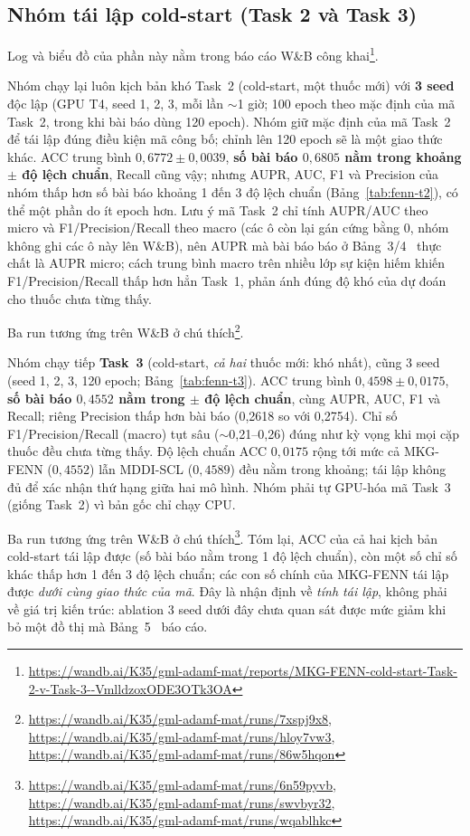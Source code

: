 \documentclass[conference]{IEEEtran}
\begin{document}
\subsection{Nhóm tái lập cold-start (Task 2 và Task 3)}
\noindent Log và biểu đồ của phần này nằm trong báo cáo W\&B công khai\footnote{\url{https://wandb.ai/K35/gml-adamf-mat/reports/MKG-FENN-cold-start-Task-2-v-Task-3--VmlldzoxODE3OTk3OA}}.

Nhóm chạy lại luôn kịch bản khó Task~2 (cold-start, một thuốc mới) với \textbf{3 seed}
độc lập (GPU T4, seed 1, 2, 3, mỗi lần $\sim$1 giờ; 100 epoch theo mặc định của mã Task~2, trong
khi bài báo dùng 120 epoch). Nhóm giữ mặc định của mã Task~2 để tái lập đúng điều kiện mã công bố;
chỉnh lên 120 epoch sẽ là một giao thức khác. ACC trung bình
$0{,}6772 \pm 0{,}0039$, \textbf{số bài báo $0{,}6805$ nằm trong khoảng $\pm$ độ lệch chuẩn}, Recall
cũng vậy; nhưng AUPR, AUC, F1 và Precision của nhóm thấp hơn số bài báo khoảng 1 đến 3 độ lệch chuẩn
(Bảng~\ref{tab:fenn-t2}), có thể một phần do ít epoch hơn. Lưu ý mã Task~2
chỉ tính AUPR/AUC theo micro và F1/Precision/Recall theo macro (các ô còn lại gán cứng
bằng $0$, nhóm không ghi các ô này lên W\&B), nên AUPR mà bài báo báo ở Bảng~3/4~\cite{mkgfenn} thực
chất là AUPR micro; cách
trung bình macro trên nhiều lớp sự kiện hiếm khiến F1/Precision/Recall thấp hơn hẳn Task~1,
phản ánh đúng độ khó của dự đoán cho thuốc chưa từng thấy.



Ba run tương ứng trên W\&B ở chú thích\footnote{\url{https://wandb.ai/K35/gml-adamf-mat/runs/7xspj9x8}, \url{https://wandb.ai/K35/gml-adamf-mat/runs/hloy7vw3}, \url{https://wandb.ai/K35/gml-adamf-mat/runs/86w5hqon}}.

Nhóm chạy tiếp \textbf{Task~3} (cold-start, \emph{cả hai} thuốc mới: khó nhất), cũng 3 seed
(seed 1, 2, 3, 120 epoch; Bảng~\ref{tab:fenn-t3}). ACC trung bình $0{,}4598 \pm 0{,}0175$, \textbf{số bài báo $0{,}4552$
nằm trong $\pm$ độ lệch chuẩn}, cùng AUPR, AUC, F1 và Recall; riêng Precision thấp hơn bài báo
(0,2618 so với 0,2754). Chỉ số F1/Precision/Recall (macro) tụt sâu ($\sim$0,21--0,26) đúng như kỳ vọng
khi mọi cặp thuốc đều chưa từng thấy. Độ lệch chuẩn ACC $0{,}0175$ rộng tới mức cả MKG-FENN ($0{,}4552$)
lẫn MDDI-SCL ($0{,}4589$) đều nằm trong khoảng; tái lập không đủ để xác nhận thứ hạng giữa hai mô hình.
Nhóm phải tự GPU-hóa mã Task~3 (giống Task~2) vì bản gốc chỉ chạy CPU.



Ba run tương ứng trên W\&B ở chú thích\footnote{\url{https://wandb.ai/K35/gml-adamf-mat/runs/6n59pyvb}, \url{https://wandb.ai/K35/gml-adamf-mat/runs/swvbyr32}, \url{https://wandb.ai/K35/gml-adamf-mat/runs/wqablhkc}}. Tóm lại, ACC của cả hai kịch bản cold-start
tái lập được (số bài báo nằm trong 1 độ lệch chuẩn), còn một số chỉ số khác thấp hơn 1 đến 3 độ lệch chuẩn; các con
số chính của MKG-FENN tái lập được \emph{dưới cùng giao thức của mã}. Đây là nhận định về \emph{tính
tái lập}, không phải về giá trị kiến trúc: ablation 3 seed dưới đây chưa quan sát được mức giảm
khi bỏ một đồ thị mà Bảng~5~\cite{mkgfenn} báo cáo.
\end{document}
